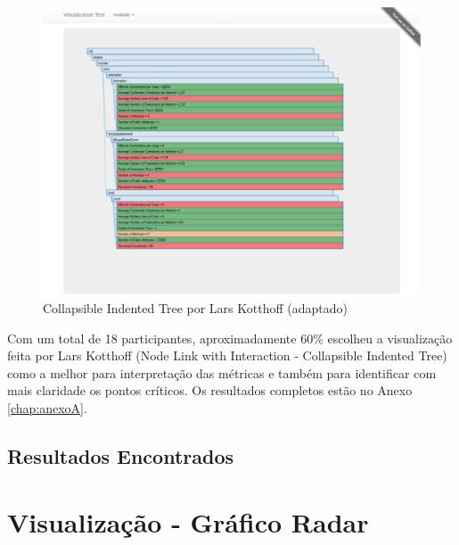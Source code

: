 \begin{figure}[!htb]
	\centering
    \includegraphics[keepaspectratio=true,scale=0.35]
    {figuras/node_link_tree_with_interaction.eps}
  \caption{Collapsible Indented Tree por Lars Kotthoff (adaptado)}
  \label{fig:node_link_tree_with_interaction}
\end{figure}

\newpage

\newpage

Com um total de 18 participantes, aproximadamente 60\% escolheu a visualização
feita por Lars Kotthoff (Node Link with Interaction - Collapsible Indented
Tree) como a melhor para interpretação das métricas e também para identificar
com mais claridade os pontos críticos. Os resultados completos estão no Anexo
\ref{chap:anexoA}.

\subsection{Resultados Encontrados}

\section{Visualização - Gráfico Radar}

